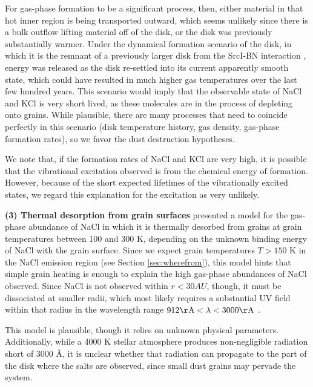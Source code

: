 \documentclass[twocolumn]{aastex62}
\newcommand{\sourcei}{SrcI\xspace}
\begin{document}
For gas-phase formation to be a significant process, then, either material in
that hot inner region is being transported outward, which seems unlikely since
there is a bulk outflow lifting material off of the disk, or the disk was
previously substantially warmer.  Under the dynamical formation scenario of the
disk, in which it is the remnant of a previously larger disk from the
\sourcei-BN interaction \citep{Bally2017a,Luhman2017a,Kim2018f},  
energy was released as the disk re-settled into its current apparently smooth
state, which could have resulted in much higher gas temperatures over the last
few hundred years.  This scenario would imply that the observable state of NaCl
and KCl is very short lived, as these molecules are in the process of depleting
onto grains.  While plausible, there are many processes that need to coincide
perfectly in this scenario (disk temperature history, gas density, gas-phase
formation rates), so we favor the dust destruction hypotheses.

We note that, if the formation rates of NaCl and KCl are very high, it is
possible that the vibrational excitation observed is from the chemical energy
of formation.  However, because of the short expected lifetimes of the
vibrationally excited states, we regard this explanation for the excitation as
very unlikely.


\textbf{(3) Thermal desorption from grain surfaces}
\citet{Decin2016a} presented a model for the gas-phase abundance of
NaCl in which it is thermally desorbed from grains at grain temperatures
between 100 and 300 K, depending on the unknown binding energy of NaCl with
the grain surface.  Since we expect grain temperatures $T>150$ K in the
NaCl emission region (see Section \ref{sec:wherefrom}), this model hints
that simple grain heating is enough to explain the high gas-phase abundances
of NaCl observed.  Since NaCl is not observed within $r<30 AU$, though,
it must be dissociated at smaller radii, which most likely requires
a substantial UV field within that radius in the wavelength range
$912 \mathrm{\AA} < \lambda < 3000 \mathrm{\AA}$ \citep{Silver1986a}.

This model is plausible, though it relies on unknown physical parameters.
Additionally, while a 4000 K stellar atmosphere \citep{Testi2010a} produces
non-negligible radiation short of 3000 \AA, it is unclear whether that
radiation can propagate to the part of the disk where the salts are observed,
since small dust grains may pervade the system.
\end{document}
